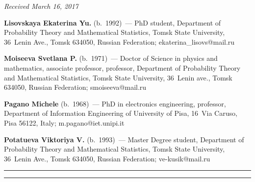 \hfill{\small\textit{Received March 16, 2017}}

\vspace*{-18pt}

\Contr

\noindent
\textbf{Lisovskaya Ekaterina Yu.} (b.\ 1992)~--- PhD student,
Department of Probability 
Theory and Mathematical Statistics, Tomsk State University, 36~Lenin Ave., 
Tomsk 634050, Russian Federation; 
\mbox{ekaterina\_lisovs@mail.ru}

\vspace*{3pt}

\noindent
\textbf{Moiseeva Svetlana P.} (b.\ 1971)~--- Doctor of Science in physics 
and mathematics, 
associate professor, professor, Department of Probability Theory
 and Mathematical Statistics, Tomsk State University, 36~Lenin ave., Tomsk 634050, 
 Russian Federation; \mbox{smoiseeva@mail.ru}

\vspace*{3pt}

\noindent
\textbf{Pagano Michele} (b.\ 1968)~--- PhD in electronics engineering,  
professor, Department of Information Engineering of University of 
Pisa, 16~Via Caruso, Pisa 56122, Italy; \mbox{m.pagano@iet.unipi.it}

\vspace*{3pt}

\noindent
\textbf{Potatueva Viktoriya V.} (b.\ 1993)~--- Master Degree student,
Department 
of Probability Theory and Mathematical Statistics, Tomsk State University, 
36~Lenin Ave., Tomsk 634050, Russian Federation; \mbox{ve-kusik@mail.ru}

\vspace*{8pt}

\hrule

\vspace*{2pt}

\hrule





\def\tit{ИССЛЕДОВАНИЕ СИСТЕМЫ МАССОВОГО ОБСЛУЖИВАНИЯ MMPP/GI/$\infty$ 
С~ТРЕБОВАНИЯМИ СЛУЧАЙНОГО ОБЪЕМА$^*$}

\def\aut{Е.\,Ю.~Лисовская$^1$, С.\,П.~Моисеева$^2$, М.~Пагано$^3$, В.\,В.~Потатуева$^4$}


\def\titkol{Исследование системы массового обслуживания MMPP/GI/$\infty$ 
с~требованиями случайного объема}

\def\autkol{Е.\,Ю.~Лисовская, С.\,П.~Моисеева, М.~Пагано, В.\,В.~Потатуева}

